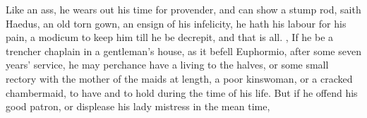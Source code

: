 
Like an ass, he wears out his time for provender, and can show a stump rod,
 saith Haedus, an old torn
gown, an ensign of his infelicity, he hath his labour for his pain, a modicum
to keep him till he be decrepit, and that is all. , \etc{} If he be a trencher chaplain in a gentleman's house, as it
befell Euphormio, after some seven years' service, he may
perchance have a living to the halves, or some small rectory with the mother of
the maids at length, a poor kinswoman, or a cracked chambermaid, to have and to
hold during the time of his life. But if he offend his good patron, or
displease his lady mistress in the mean time,

